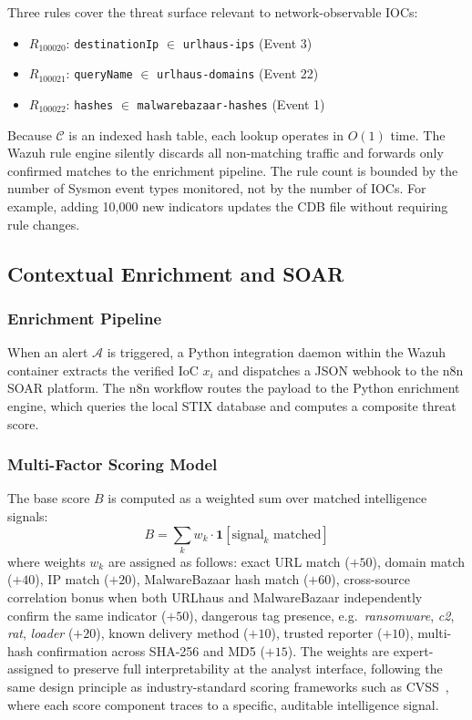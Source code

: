 \documentclass[conference]{IEEEtran}
\begin{document}
Three rules cover the threat surface relevant to network-observable IOCs:
\begin{itemize}
    \item $R_{100020}$: \texttt{destinationIp} $\in$ \texttt{urlhaus-ips} (Event 3)
    \item $R_{100021}$: \texttt{queryName} $\in$ \texttt{urlhaus-domains} (Event 22)
    \item $R_{100022}$: \texttt{hashes} $\in$ \texttt{malwarebazaar-hashes} (Event 1)
\end{itemize}

Because $\mathcal{C}$ is an indexed hash table, each lookup operates in $O(1)$ time. The Wazuh rule engine silently discards all non-matching traffic and forwards only confirmed matches to the enrichment pipeline. The rule count is bounded by the number of Sysmon event types monitored, not by the number of IOCs. For example, adding 10,000 new indicators updates the CDB file without requiring rule changes.

\subsection{Contextual Enrichment and SOAR}

\subsubsection{Enrichment Pipeline}
When an alert $\mathcal{A}$ is triggered, a Python integration daemon within the Wazuh container extracts the verified IoC $x_i$ and dispatches a JSON webhook to the n8n SOAR platform. The n8n workflow routes the payload to the Python enrichment engine, which queries the local STIX database and computes a composite threat score.

\subsubsection{Multi-Factor Scoring Model}
The base score $B$ is computed as a weighted sum over matched intelligence signals:
\begin{equation}
B = \sum_{k} w_k \cdot \mathbf{1}[\text{signal}_k \text{ matched}]
\end{equation}
where weights $w_k$ are assigned as follows: exact URL match ($+50$), domain match ($+40$), IP match ($+20$), MalwareBazaar hash match ($+60$), cross-source correlation bonus when both URLhaus and MalwareBazaar independently confirm the same indicator ($+50$), dangerous tag presence, e.g.\ \textit{ransomware}, \textit{c2}, \textit{rat}, \textit{loader} ($+20$), known delivery method ($+10$), trusted reporter ($+10$), multi-hash confirmation across SHA-256 and MD5 ($+15$). The weights are expert-assigned to preserve full interpretability at the analyst interface, following the same design principle as industry-standard scoring frameworks such as CVSS~\cite{mitre}, where each score component traces to a specific, auditable intelligence signal.
\end{document}
